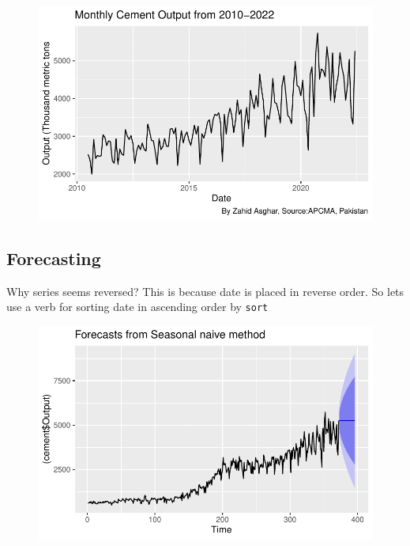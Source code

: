 \documentclass[
  letterpaper,
  DIV=11,
  numbers=noendperiod]{scrartcl}
\newenvironment{Shaded}{\begin{snugshade}}{\end{snugshade}}
\newcommand{\AttributeTok}[1]{\textcolor[rgb]{0.40,0.45,0.13}{#1}}
\newcommand{\DecValTok}[1]{\textcolor[rgb]{0.68,0.00,0.00}{#1}}
\newcommand{\FunctionTok}[1]{\textcolor[rgb]{0.28,0.35,0.67}{#1}}
\newcommand{\NormalTok}[1]{\textcolor[rgb]{0.00,0.23,0.31}{#1}}
\newcommand{\SpecialCharTok}[1]{\textcolor[rgb]{0.37,0.37,0.37}{#1}}
\begin{document}
\begin{figure}[H]

{\centering \includegraphics[width=17.1875in,height=\textheight]{cement_files/figure-pdf/unnamed-chunk-10-1.pdf}

}

\end{figure}

\hypertarget{forecasting}{%
\subsection{Forecasting}\label{forecasting}}

Why series seems reversed? This is because date is placed in reverse
order. So lets use a verb for sorting date in ascending order by
\texttt{sort}

\begin{Shaded}
\end{Shaded}

\begin{figure}[H]

{\centering \includegraphics[width=17.1875in,height=\textheight]{cement_files/figure-pdf/unnamed-chunk-11-1.pdf}

}

\end{figure}
\end{document}
